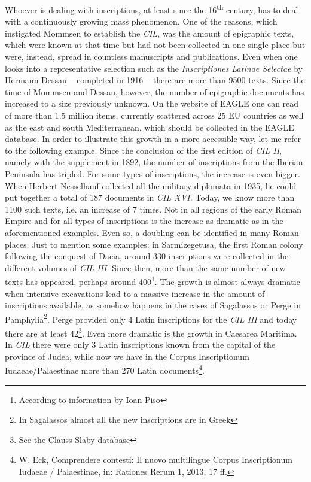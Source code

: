 \documentclass[amsthm,ebook]{saparticle}
\begin{document}
Whoever is dealing with inscriptions, at least since the 16\textsuperscript{th} 
century, has to deal with a continuously growing mass phenomenon. One of the reasons, 
which instigated Mommsen to establish the \textit{CIL}, was the amount of epigraphic 
texts, which were known at that time but had not been collected in one single place 
but were, instead, spread in countless manuscripts and publications. Even when 
one looks into a representative selection such as the \textit{Inscriptiones Latinae 
Selectae }by Hermann Dessau – completed in 1916 – there are more than 9500 
texts. Since the time of Mommsen and Dessau, however, the number of epigraphic 
documents has increased to a size previously unknown. On the website of EAGLE one 
can read of more than 1.5 million items, currently scattered across 25 EU countries 
as well as the east and south Mediterranean, which should be collected in the EAGLE 
database. In order to illustrate this growth in a more accessible way, let me refer 
to the following example. Since the conclusion of the first edition of \textit{CIL 
II}, namely with the supplement in 1892, the number of inscriptions from the Iberian 
Peninsula has tripled. For some types of inscriptions, the increase is even bigger. 
When Herbert Nesselhauf collected all the military diplomata in 1935, he could 
put together a total of 187 documents in \textit{CIL XVI. }Today, we know more 
than 1100 such texts, i.e. an increase of 7 times. Not in all regions of the early 
Roman Empire and for all types of inscriptions is the increase as dramatic as in 
the aforementioned examples. Even so, a doubling can be identified in many Roman 
places. Just to mention some examples: in Sarmizegetusa, the first Roman colony 
following the conquest of Dacia, around 330 inscriptions were collected in the 
different volumes of \textit{CIL III.} Since then, more than the same number of 
new texts has appeared, perhaps around 400\footnote{According to information by Ioan Piso}. The growth is almost always dramatic 
when intensive excavations lead to a massive increase in the amount of inscriptions 
available, as somehow happens in the cases of Sagalassos or Perge in Pamphylia\footnote{In Sagalassos almost all the new inscriptions are in Greek}. 
Perge provided only 4 Latin inscriptions for the \textit{CIL III} and today there 
are at least 42\footnote{See the Clauss-Slaby database}. Even more dramatic is the growth in Caesarea Maritima. In \textit{CIL 
}there were only 3 Latin inscriptions known from the capital of the province of 
Judea, while now we have in the Corpus Inscriptionum Iudaeae/Palaestinae more than 
270 Latin documents\footnote{W. Eck, Comprendere contesti: Il nuovo multilingue Corpus Inscriptionum Iudaeae / Palaestinae, in: Rationes Rerum 1, 2013, 17 ff.}.   
\end{document}
